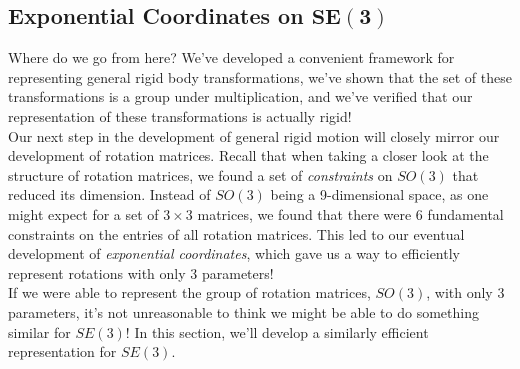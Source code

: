 \documentclass[oneside]{book}
\begin{document}
\subsection{Exponential Coordinates on $\mathbf{SE(3)}$}
Where do we go from here? We've developed a convenient framework for representing general rigid body transformations, we've shown that the set of these transformations is a group under multiplication, and we've verified that our representation of these transformations is actually rigid!\\
Our next step in the development of general rigid motion will closely mirror our development of rotation matrices. Recall that when taking a closer look at the structure of rotation matrices, we found a set of \textit{constraints} on $SO(3)$ that reduced its dimension. Instead of $SO(3)$ being a 9-dimensional space, as one might expect for a set of $3\times 3$ matrices, we found that there were 6 fundamental constraints on the entries of all rotation matrices. This led to our eventual development of \textit{exponential coordinates}, which gave us a way to efficiently represent rotations with only 3 parameters!\\
If we were able to represent the group of rotation matrices, $SO(3)$, with only 3 parameters, it's not unreasonable to think we might be able to do something similar for $SE(3)$! In this section, we'll develop a similarly efficient representation for $SE(3)$.
\end{document}
